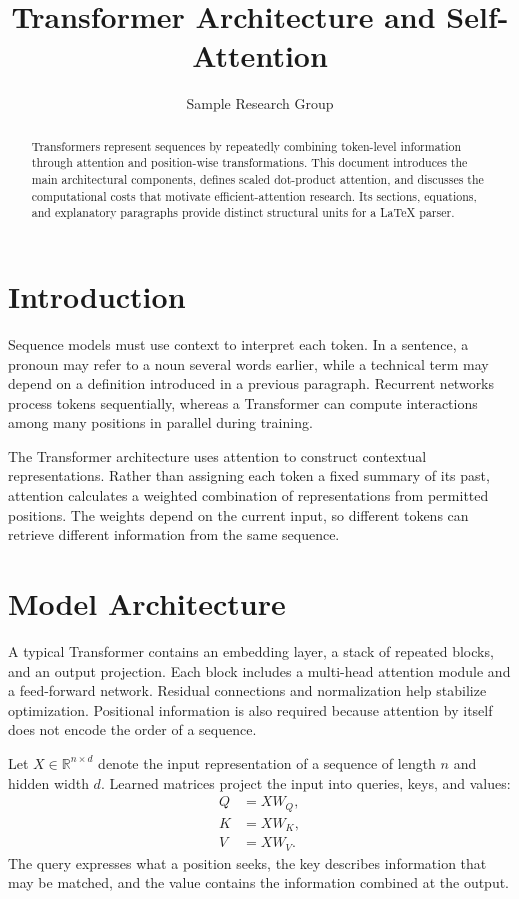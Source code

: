 \documentclass{article}
\title{Transformer Architecture and Self-Attention}
\author{Sample Research Group}
\date{}
\begin{document}
\maketitle

\begin{abstract}
Transformers represent sequences by repeatedly combining token-level information through attention and position-wise transformations. This document introduces the main architectural components, defines scaled dot-product attention, and discusses the computational costs that motivate efficient-attention research. Its sections, equations, and explanatory paragraphs provide distinct structural units for a LaTeX parser.
\end{abstract}

\section{Introduction}
Sequence models must use context to interpret each token. In a sentence, a pronoun may refer to a noun several words earlier, while a technical term may depend on a definition introduced in a previous paragraph. Recurrent networks process tokens sequentially, whereas a Transformer can compute interactions among many positions in parallel during training.

The Transformer architecture uses attention to construct contextual representations. Rather than assigning each token a fixed summary of its past, attention calculates a weighted combination of representations from permitted positions. The weights depend on the current input, so different tokens can retrieve different information from the same sequence.

\section{Model Architecture}
A typical Transformer contains an embedding layer, a stack of repeated blocks, and an output projection. Each block includes a multi-head attention module and a feed-forward network. Residual connections and normalization help stabilize optimization. Positional information is also required because attention by itself does not encode the order of a sequence.

Let $X\in\mathbb{R}^{n\times d}$ denote the input representation of a sequence of length $n$ and hidden width $d$. Learned matrices project the input into queries, keys, and values:
\begin{align}
Q &= XW_Q,\\
K &= XW_K,\\
V &= XW_V.
\end{align}
The query expresses what a position seeks, the key describes information that may be matched, and the value contains the information combined at the output.
\end{document}
